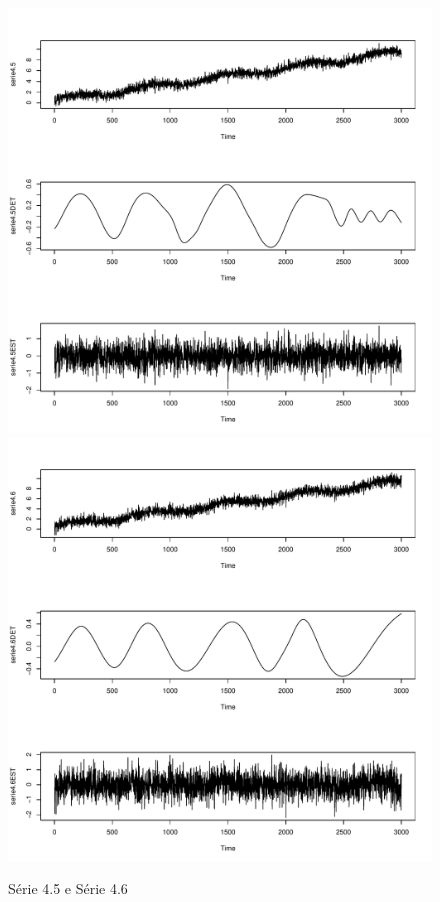 \graphicspath{{imagens/}}
\begin{figure}[H]
\begin{center}
  \includegraphics[scale=0.43]{serie4_5.pdf} \quad
  \includegraphics[scale=0.43]{serie4_6.pdf}
 \caption{Série 4.5 e Série 4.6}

\end{center}
\end{figure}

